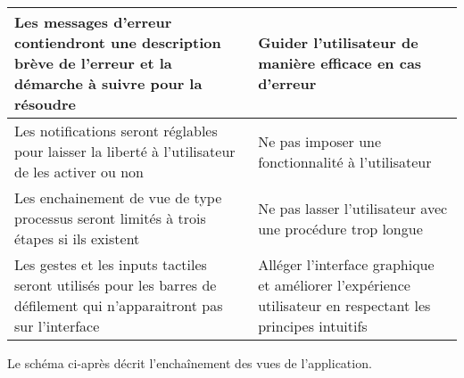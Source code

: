 \begin{table}[H]
\begin{tabular}{p{8cm}|p{8cm}}
        Les messages d'erreur contiendront une description brève de l'erreur et la démarche à suivre pour la résoudre & Guider l'utilisateur de manière efficace en cas d'erreur \\ \hline
        Les notifications seront réglables pour laisser la liberté à l'utilisateur de les activer ou non & Ne pas imposer une fonctionnalité à l'utilisateur \\ \hline
        Les enchainement de vue de type processus seront limités à trois étapes si ils existent & Ne pas lasser l'utilisateur avec une procédure trop longue \\ \hline
        Les gestes et les inputs tactiles seront utilisés pour les barres de défilement qui n'apparaitront pas sur l'interface & Alléger l'interface graphique et améliorer l'expérience utilisateur en respectant les principes intuitifs \\
    \end{tabular}
\end{table}

    Le schéma ci-après décrit l'enchaînement des vues de l'application.
    
